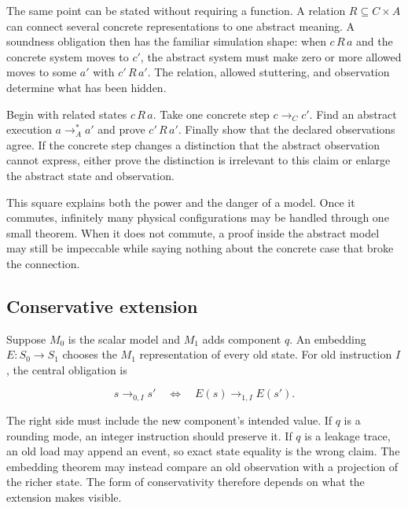 The same point can be stated without requiring a function. A relation
\(R\subseteq C\mathbin{\times}A\) can connect several concrete
representations to one abstract meaning. A soundness obligation then has the
familiar simulation shape: when \(c\,R\,a\) and the concrete system moves to
\(c'\), the abstract system must make zero or more allowed moves to some
\(a'\) with \(c'\,R\,a'\). The relation, allowed stuttering, and observation
determine what has been hidden.

\begin{proofkit}[title={The commuting square at a model boundary}]
Begin with related states \(c\,R\,a\). Take one concrete step
\(c\longrightarrow_C c'\). Find an abstract execution
\(a\longrightarrow_A^* a'\) and prove \(c'\,R\,a'\). Finally show that the
declared observations agree. If the concrete step changes a distinction that
the abstract observation cannot express, either prove the distinction is
irrelevant to this claim or enlarge the abstract state and observation.
\end{proofkit}

This square explains both the power and the danger of a model. Once it
commutes, infinitely many physical configurations may be handled through one
small theorem. When it does not commute, a proof inside the abstract model may
still be impeccable while saying nothing about the concrete case that broke
the connection.

\subsection{Conservative extension}

Suppose \(M_0\) is the scalar model and \(M_1\) adds component \(q\). An
embedding \(E:S_0\rightarrow S_1\) chooses the \(M_1\) representation of every
old state. For old instruction \(I\), the central obligation is

\[
  s\mathrel{\longrightarrow_{0,I}}s'
  \quad\Longleftrightarrow\quad
  E(s)\mathrel{\longrightarrow_{1,I}}E(s').
\]

The right side must include the new component's intended value. If \(q\) is a
rounding mode, an integer instruction should preserve it. If \(q\) is a
leakage trace, an old load may append an event, so exact state equality is the
wrong claim. The embedding theorem may instead compare an old observation
with a projection of the richer state. The form of conservativity therefore
depends on what the extension makes visible.

